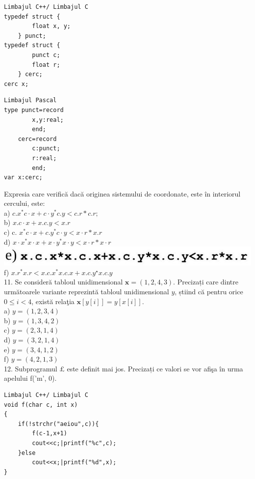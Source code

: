\documentclass[10pt]{article}
\begin{document}
\begin{verbatim}
Limbajul C++/ Limbajul C
typedef struct {
        float x, y;
    } punct;
typedef struct {
        punct c;
        float r;
    } cerc;
cerc x;
\end{verbatim}

\begin{verbatim}
Limbajul Pascal
type punct=record
        x,y:real;
        end;
    cerc=record
        c:punct;
        r:real;
        end;
var x:cerc;
\end{verbatim}

Expresia care verifică dacă originea sistemului de coordonate, este în interiorul cercului, este:\\
a) $c . x^{*} c \cdot x+c \cdot y^{*} c . y<c . r * c . r ;$\\
b) $x . c \cdot x+x . c . y<x . r$\\
c) c. $x^{*} c \cdot x+c . y^{*} c \cdot y<x \cdot r * x . r$\\
d) $x \cdot x^{*} x \cdot x+x \cdot y^{*} x \cdot y<x \cdot r * x \cdot r$\\
\includegraphics[max width=\textwidth, center]{2025_04_17_46e04c6acd873ea9558dg-047}\\
f) $x . r^{*} x . r<x . c . x^{*} x . c . x+x . c . y^{\star} x . c . y$\\
11. Se consideră tabloul unidimensional $\mathbf{x}=(1,2,4,3)$. Precizați care dintre următoarele variante reprezintă tabloul unidimensional $y$, știind că pentru orice $0 \leq i<4$, există relaţia $\mathbf{x}[y[i]]=y[x[i]]$.\\
a) $y=(1,2,3,4)$\\
b) $y=(1,3,4,2)$\\
c) $y=(2,3,1,4)$\\
d) $y=(3,2,1,4)$\\
e) $y=(3,4,1,2)$\\
f) $y=(4,2,1,3)$\\
12. Subprogramul $\pounds$ este definit mai jos. Precizați ce valori se vor afişa în urma apelului f('m', 0).

\begin{verbatim}
Limbajul C++/ Limbajul C
void f(char c, int x)
{
    if(!strchr("aeiou",c)){
        f(c-1,x+1)
        cout<<c;|printf("%c",c);
    }else
        cout<<x;|printf("%d",x);
}
\end{verbatim}
\end{document}
